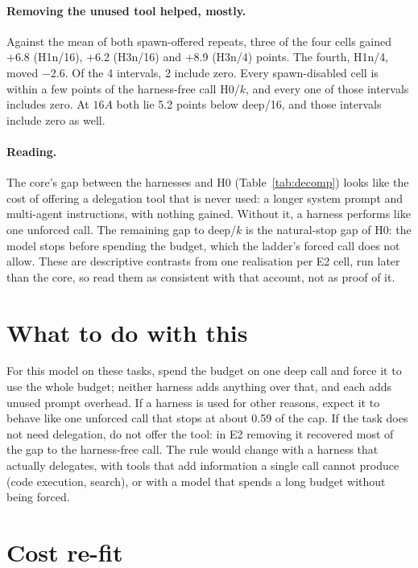 \documentclass[11pt]{article}
\begin{document}
\paragraph{Removing the unused tool helped, mostly.} Against the mean of both spawn-offered repeats, three of the
four cells gained +6.8 (H1n/16), +6.2 (H3n/16) and
+8.9 (H3n/4) points. The fourth, H1n/4, moved $-$2.6.
Of the 4 intervals, 2 include zero. Every spawn-disabled cell
is within a few points of the harness-free call H0/$k$, and every one of those intervals includes zero. At $16A$
both lie 5.2 points below deep/16, and those intervals include zero as well.

\paragraph{Reading.} The core's gap between the harnesses and H0 (Table~\ref{tab:decomp}) looks like the cost of
offering a delegation tool that is never used: a longer system prompt and multi-agent instructions, with nothing
gained. Without it, a harness performs like one unforced call. The remaining gap to deep/$k$ is the
natural-stop gap of H0: the model stops before spending the budget, which the ladder's forced call does not allow.
These are descriptive contrasts from one realisation per E2 cell, run later than the core, so read them as
consistent with that account, not as proof of it.

\section{What to do with this}

For this model on these tasks, spend the budget on one deep call and force it to use the whole budget; neither
harness adds anything over that, and each adds unused prompt overhead. If a harness is used for other reasons,
expect it to behave like one unforced call that stops at about 0.59 of the cap.
If the task does not need delegation, do not offer the tool: in E2 removing it recovered most of the gap to the
harness-free call.
The
rule would change with a harness that actually delegates, with tools that add information a single call cannot
produce (code execution, search), or with a model that spends a long budget without being forced.

\section{Cost re-fit}
\end{document}
